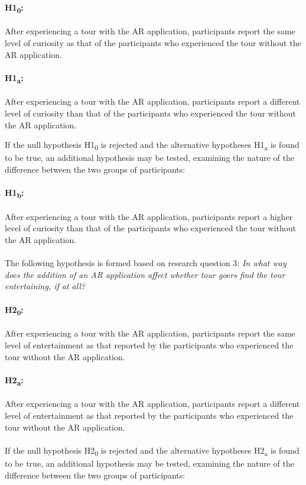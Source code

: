 \paragraph{H1\textsubscript{0}:} After experiencing a tour with the AR application, participants report the same level of curiosity as that of the participants who experienced the tour without the AR application.

\paragraph{H1\textsubscript{a}:}  After experiencing a tour with the AR application, participants report a different level of curiosity than that of the participants who experienced the tour without the AR application.\pagebreak

If the null hypothesis H1\textsubscript{0} is rejected and the alternative hypotheses H1\textsubscript{a} is found to be true, an additional hypothesis may be tested, examining the nature of the difference between the two groups of participants:

\paragraph{H1\textsubscript{b}:} After experiencing a tour with the AR application, participants report a higher level of curiosity than that of the participants who experienced the tour without the AR application.\\
\\
The following hypothesis is formed based on research question 3: \textit{In what way does the addition of an AR application affect whether tour goers find the tour entertaining, if at all?}

\paragraph{H2\textsubscript{0}:} After experiencing a tour with the AR application, participants report the same level of entertainment as that reported by the participants who experienced the tour without the AR application.

\paragraph{H2\textsubscript{a}:} After experiencing a tour with the AR application, participants report a different level of entertainment as that reported by the participants who experienced the tour without the AR application.\\
\\
If the null hypothesis H2\textsubscript{0} is rejected and the alternative hypotheses H2\textsubscript{a} is found to be true, an additional hypothesis may be tested, examining the nature of the difference between the two groups of participants:


